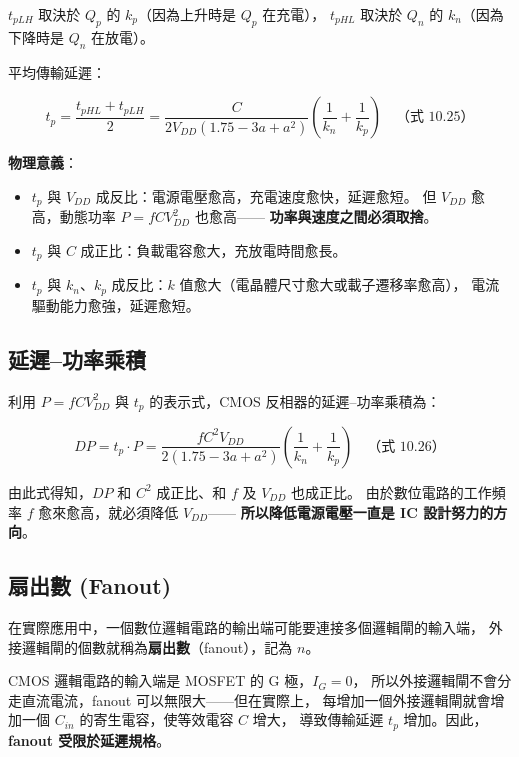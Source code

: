 \documentclass[12pt]{article}
\begin{document}
$t_{pLH}$ 取決於 $Q_p$ 的 $k_p$（因為上升時是 $Q_p$ 在充電），
$t_{pHL}$ 取決於 $Q_n$ 的 $k_n$（因為下降時是 $Q_n$ 在放電）。

平均傳輸延遲：

\begin{formulabox}
\[
  t_p = \frac{t_{pHL} + t_{pLH}}{2}
      = \frac{C}{2V_{DD}(1.75 - 3a + a^2)}
        \left(\frac{1}{k_n} + \frac{1}{k_p}\right)
  \quad\text{（式 10.25）}
\]
\end{formulabox}

\textbf{物理意義}：
\begin{itemize}[leftmargin=2.2em,itemsep=2pt]
  \item $t_p$ 與 $V_{DD}$ 成反比：電源電壓愈高，充電速度愈快，延遲愈短。
    但 $V_{DD}$ 愈高，動態功率 $P = fCV_{DD}^2$ 也愈高——
    \textbf{功率與速度之間必須取捨}。
  \item $t_p$ 與 $C$ 成正比：負載電容愈大，充放電時間愈長。
  \item $t_p$ 與 $k_n$、$k_p$ 成反比：$k$ 值愈大（電晶體尺寸愈大或載子遷移率愈高），
    電流驅動能力愈強，延遲愈短。
\end{itemize}

\subsection*{延遲--功率乘積}

利用 $P = fCV_{DD}^2$ 與 $t_p$ 的表示式，CMOS 反相器的延遲--功率乘積為：

\begin{formulabox}
\[
  DP = t_p \cdot P = \frac{fC^2 V_{DD}}{2(1.75-3a+a^2)}
    \left(\frac{1}{k_n}+\frac{1}{k_p}\right)
  \quad\text{（式 10.26）}
\]
\end{formulabox}

由此式得知，$DP$ 和 $C^2$ 成正比、和 $f$ 及 $V_{DD}$ 也成正比。
由於數位電路的工作頻率 $f$ 愈來愈高，就必須降低 $V_{DD}$——
\textbf{所以降低電源電壓一直是 IC 設計努力的方向}。

\subsection*{扇出數 (Fanout)}

在實際應用中，一個數位邏輯電路的輸出端可能要連接多個邏輯閘的輸入端，
外接邏輯閘的個數就稱為\textbf{扇出數}（fanout），記為 $n$。

CMOS 邏輯電路的輸入端是 MOSFET 的 G 極，$I_G = 0$，
所以外接邏輯閘不會分走直流電流，fanout 可以無限大——但在實際上，
每增加一個外接邏輯閘就會增加一個 $C_{in}$ 的寄生電容，使等效電容 $C$ 增大，
導致傳輸延遲 $t_p$ 增加。因此，\textbf{fanout 受限於延遲規格}。
\end{document}
